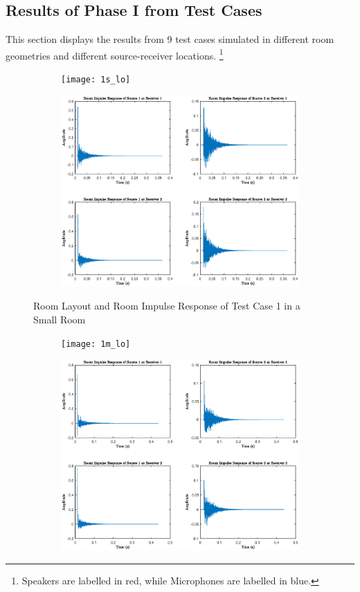 \documentclass[a4paper,twoside,12pt,hidelinks]{article}
\begin{document}
\begin{appendices}
\section{Results of Phase I from Test Cases}
\label{appendixresult}
This section displays the results from 9 test cases simulated in different room geometries and different source-receiver locations. \footnote{Speakers are labelled in red, while Microphones are labelled in blue.}
\begin{figure}[H]
\centering	
\begin{subfigure}[H]{0.4\textwidth}
\texttt{[image: 1s\_lo]}
\end{subfigure}
\begin{subfigure}[H]{0.45\textwidth}
\includegraphics[width=\textwidth]{1s_ir}
\end{subfigure}
\caption{Room Layout and Room Impulse Response of Test Case 1 in a Small Room}
\end{figure}
\begin{figure}[H]
\centering
\begin{subfigure}[H]{0.4\textwidth}
\texttt{[image: 1m\_lo]}
\end{subfigure}
\begin{subfigure}[H]{0.45\textwidth}
\includegraphics[width=\textwidth]{1m_ir}

\end{subfigure}
\end{figure}
\end{appendices}
\end{document}
